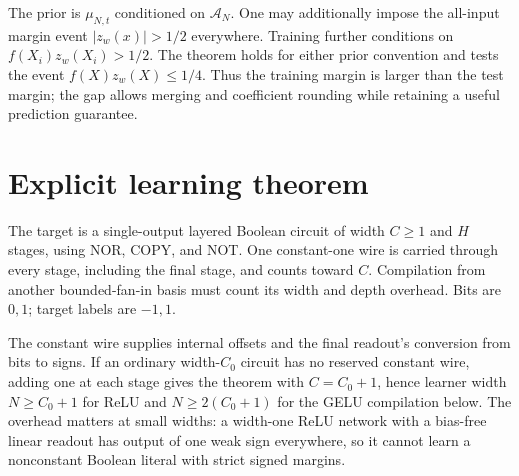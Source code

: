 \documentclass[11pt]{article}
\begin{document}
The prior is $\mu_{N,t}$ conditioned on $\mathcal A_N$. One may additionally impose the all-input margin event $|z_w(x)|>1/2$ everywhere. Training further conditions on $f(X_i)z_w(X_i)>1/2$. The theorem holds for either prior convention and tests the event $f(X)z_w(X)\le1/4$. Thus the training margin is larger than the test margin; the gap allows merging and coefficient rounding while retaining a useful prediction guarantee.

\section{Explicit learning theorem}
The target is a single-output layered Boolean circuit of width $C\ge1$ and $H$ stages, using NOR, COPY, and NOT. One constant-one wire is carried through every stage, including the final stage, and counts toward $C$. Compilation from another bounded-fan-in basis must count its width and depth overhead. Bits are $0,1$; target labels are $-1,1$.

The constant wire supplies internal offsets and the final readout's conversion from bits to signs. If an
ordinary width-$C_0$ circuit has no reserved constant wire, adding one at
each stage gives the theorem with $C=C_0+1$, hence learner width
$N\ge C_0+1$ for ReLU and $N\ge2(C_0+1)$ for the GELU compilation below.
The overhead matters at small widths: a width-one ReLU network with a
bias-free linear readout has output of one weak sign everywhere, so it
cannot learn a nonconstant Boolean literal with strict signed margins.
\end{document}
